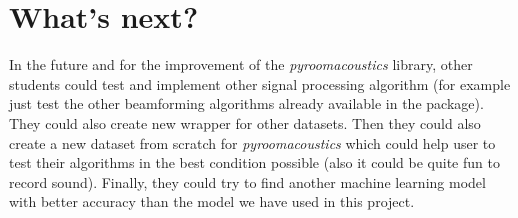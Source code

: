 \documentclass[11pt,a4paper,titlepage]{report}
\begin{document}
\section{What's next?}
In the future and for the improvement of the \textit{pyroomacoustics} library, other students could test and implement other signal processing algorithm (for example just test the other beamforming algorithms already available in the package). They could also create new wrapper for other datasets. Then they could also create a new dataset from scratch for \textit{pyroomacoustics} which could help user to test their algorithms in the best condition possible (also it could be quite fun to record sound). Finally, they could try to find another machine learning model with better accuracy than the model we have used in this project.

\printbibliography[
heading=bibintoc,
title={Bibliography}
]
\end{document}
